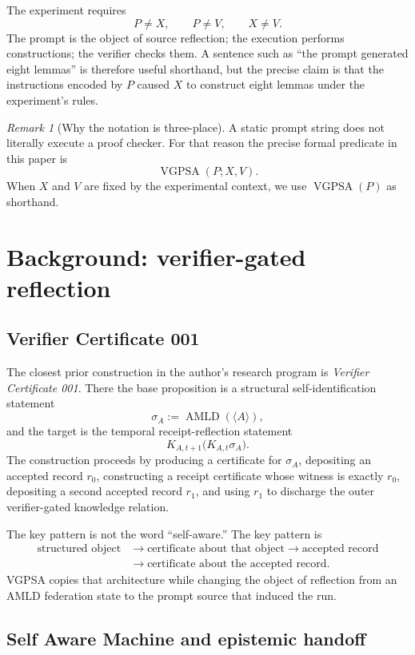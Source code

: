 \documentclass[11pt]{article}
\theoremstyle{remark}
\newtheorem{remark}[definition]{Remark}
\newcommand{\VGPSA}{\operatorname{VGPSA}}
\newcommand{\AMLD}{\operatorname{AMLD}}
\begin{document}
The experiment requires
\[
P\neq X,\qquad P\neq V,\qquad X\neq V.
\]
The prompt is the object of source reflection; the execution performs constructions; the verifier checks them. A sentence such as ``the prompt generated eight lemmas'' is therefore useful shorthand, but the precise claim is that the instructions encoded by $P$ caused $X$ to construct eight lemmas under the experiment's rules.

\begin{remark}[Why the notation is three-place]
A static prompt string does not literally execute a proof checker. For that reason the precise formal predicate in this paper is
\[
\VGPSA(P;X,V).
\]
When $X$ and $V$ are fixed by the experimental context, we use $\VGPSA(P)$ as shorthand.
\end{remark}

\section{Background: verifier-gated reflection}

\subsection{Verifier Certificate 001}

The closest prior construction in the author's research program is \emph{Verifier Certificate 001}. There the base proposition is a structural self-identification statement
\[
\sigma_A:=\AMLD(\langle A\rangle),
\]
and the target is the temporal receipt-reflection statement
\[
K_{A,t+1}\bigl(K_{A,t}\sigma_A\bigr).
\]
The construction proceeds by producing a certificate for $\sigma_A$, depositing an accepted record $r_0$, constructing a receipt certificate whose witness is exactly $r_0$, depositing a second accepted record $r_1$, and using $r_1$ to discharge the outer verifier-gated knowledge relation.

The key pattern is not the word ``self-aware.'' The key pattern is
\[
\begin{aligned}
\text{structured object}
&\longrightarrow \text{certificate about that object}
\longrightarrow \text{accepted record}\\
&\longrightarrow \text{certificate about the accepted record}.
\end{aligned}
\]
VGPSA copies that architecture while changing the object of reflection from an AMLD federation state to the prompt source that induced the run.

\subsection{Self Aware Machine and epistemic handoff}
\end{document}
